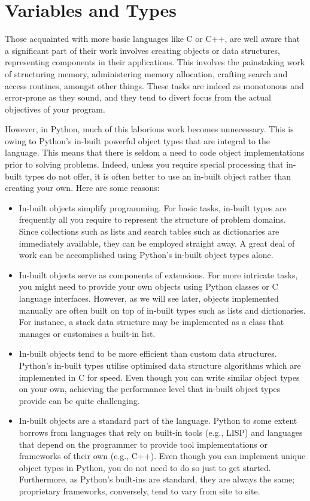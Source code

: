 \documentclass[12pt]{book}
\begin{document}
\chapter{Variables and Types}

Those acquainted with more basic languages like C or C++, are well aware that a significant part of their work involves creating objects or data structures, representing components in their applications. This involves the painstaking work of structuring memory, administering memory allocation, crafting search and access routines, amongst other things. These tasks are indeed as monotonous and error-prone as they sound, and they tend to divert focus from the actual objectives of your program.

However, in Python, much of this laborious work becomes unnecessary. This is owing to Python's in-built powerful object types that are integral to the language. This means that there is seldom a need to code object implementations prior to solving problems. Indeed, unless you require special processing that in-built types do not offer, it is often better to use an in-built object rather than creating your own. Here are some reasons:

\begin{itemize}
\item In-built objects simplify programming. For basic tasks, in-built types are frequently all you require to represent the structure of problem domains. Since collections such as lists and search tables such as dictionaries are immediately available, they can be employed straight away. A great deal of work can be accomplished using Python's in-built object types alone.

\item In-built objects serve as components of extensions. For more intricate tasks, you might need to provide your own objects using Python classes or C language interfaces. However, as we will see later, objects implemented manually are often built on top of in-built types such as lists and dictionaries. For instance, a stack data structure may be implemented as a class that manages or customises a built-in list.

\item In-built objects tend to be more efficient than custom data structures. Python's in-built types utilise optimised data structure algorithms which are implemented in C for speed. Even though you can write similar object types on your own, achieving the performance level that in-built object types provide can be quite challenging.

\item In-built objects are a standard part of the language. Python to some extent borrows from languages that rely on built-in tools (e.g., LISP) and languages that depend on the programmer to provide tool implementations or frameworks of their own (e.g., C++). Even though you can implement unique object types in Python, you do not need to do so just to get started. Furthermore, as Python's built-ins are standard, they are always the same; proprietary frameworks, conversely, tend to vary from site to site.
\end{itemize}
\end{document}
